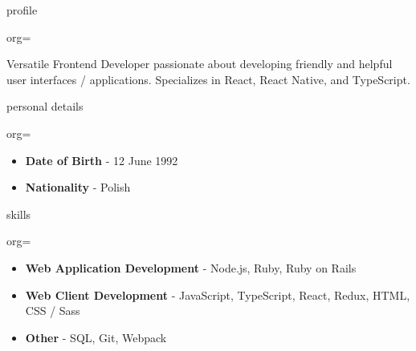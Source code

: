 \documentclass{resume}
\begin{document}
\makeheader

\begin{ResumeSection}{profile}
    \begin{ResumeSubsection}{org=}
        \par{Versatile Frontend Developer passionate about developing friendly and helpful user interfaces / applications. Specializes in React, React Native, and TypeScript.}
    \end{ResumeSubsection}
\end{ResumeSection}

\begin{ResumeSection}{personal details}
    \newcommand{\skill}[2]{\textbf{#1} - #2}
    \begin{ResumeSubsection}{org=}
        \begin{itemize}
            \item \skill{Date of Birth}{12 June 1992}
            \item \skill{Nationality}{Polish}
        \end{itemize}
    \end{ResumeSubsection}
\end{ResumeSection}

\begin{ResumeSection}{skills}
    \newcommand{\skill}[2]{\textbf{#1} - #2}
    \begin{ResumeSubsection}{org=}
        \begin{itemize}
            \item \skill{Web Application Development}{Node.js, Ruby, Ruby on Rails}
            \item \skill{Web Client Development}{JavaScript, TypeScript, React, Redux, HTML, CSS / Sass}
            \item \skill{Other}{SQL, Git, Webpack}
        \end{itemize}
    \end{ResumeSubsection}
\end{ResumeSection}
\end{document}
